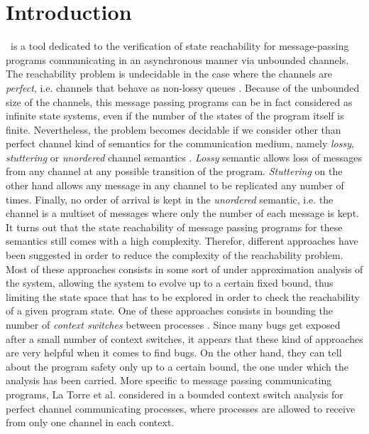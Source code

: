 \section{Introduction}

\MPass\ is a tool dedicated to the verification of state reachability for message-passing programs 
communicating in an asynchronous manner via unbounded channels.
%
The reachability problem is undecidable in the case where the channels are \textit{perfect},
i.e. channels that behave as non-lossy queues\cite{BZ83} .
%
Because of the unbounded size of the channels, this message passing programs can be in fact considered as infinite state systems,
even if the number of the states of the program itself is finite.
%
Nevertheless, the problem becomes decidable if we consider other than perfect channel kind of semantics for the communication medium,
namely \textit{lossy}, \textit{stuttering} or \textit{unordered} channel semantics \cite{AB93,Rack78,phs-IPL2002,lipton}.
\textit{Lossy} semantic allows loss of messages from any channel at any possible transition of the program.
\textit{Stuttering} on the other hand allows any message in any channel to be replicated any number of times.
Finally, no order of arrival is kept in the \textit{unordered} semantic, 
i.e. the channel is a multiset of messages where only the number of each message is kept.
%
It turns out that the state reachability of message passing programs for these semantics
still comes with a high complexity.
%
Therefor, different approaches have been suggested in order to reduce the complexity of the reachability problem.
%
Most of these approaches consists in some sort of under approximation analysis of the system,
allowing the system to evolve up to a certain fixed bound, thus limiting the state space that has to be explored
in order to check the reachability of a given program state.
%
One of these approaches consists in bounding the number of \textit{context switches} between processes \cite{SJ05}.
%
Since many bugs get exposed after a small number of context switches,
it appears that these kind of approaches are very helpful when it comes to find bugs.
%
On the other hand, they can tell about the program safety only up to a certain bound, the one under which the analysis has been carried.
%
More specific to message passing communicating programs,
La Torre et al. considered in \cite{LaTorre08} a bounded context switch analysis for perfect channel communicating processes,
where processes are allowed to receive from only one channel in each context.


